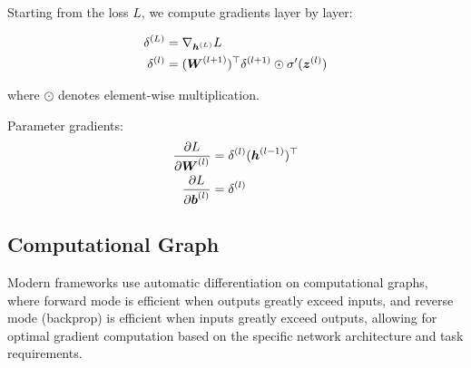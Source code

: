 Starting from the loss $L$, we compute gradients layer by layer:

\begin{align}
\delta^{(L)} &= \nabla_{\boldsymbol{h}^{(L)}} L \\
\delta^{(l)} &= (\boldsymbol{W}^{(l+1)})^\top \delta^{(l+1)} \odot \sigma'(\boldsymbol{z}^{(l)})
\end{align}

where $\odot$ denotes element-wise multiplication.

Parameter gradients:
\begin{align}
\frac{\partial L}{\partial \boldsymbol{W}^{(l)}} &= \delta^{(l)} (\boldsymbol{h}^{(l-1)})^\top \\
\frac{\partial L}{\partial \boldsymbol{b}^{(l)}} &= \delta^{(l)}
\end{align}

\subsection{Computational Graph}

Modern frameworks use automatic differentiation on computational graphs, where forward mode is efficient when outputs greatly exceed inputs, and reverse mode (backprop) is efficient when inputs greatly exceed outputs, allowing for optimal gradient computation based on the specific network architecture and task requirements.


